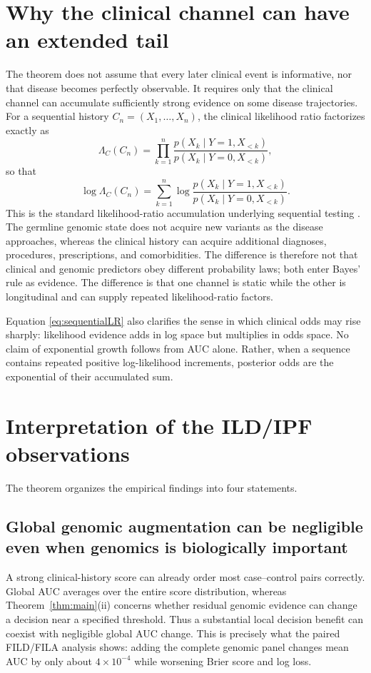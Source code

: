 \documentclass[journal]{IEEEtran}
\newcommand{\LR}{\Lambda}
\begin{document}
\section{Why the clinical channel can have an extended tail}

The theorem does not assume that every later clinical event is informative, nor that disease becomes perfectly observable. It requires only that the clinical channel can accumulate sufficiently strong evidence on some disease trajectories. For a sequential history $C_n=(X_1,\ldots,X_n)$, the clinical likelihood ratio factorizes exactly as
\begin{equation}
\LR_C(C_n)
=\prod_{k=1}^{n}
\frac{p(X_k\mid Y=1,X_{<k})}
     {p(X_k\mid Y=0,X_{<k})},
\label{eq:sequentialLR}
\end{equation}
so that
\begin{equation}
\log\LR_C(C_n)
=\sum_{k=1}^{n}
\log
\frac{p(X_k\mid Y=1,X_{<k})}
     {p(X_k\mid Y=0,X_{<k})}.
\label{eq:sequentiallogLR}
\end{equation}
This is the standard likelihood-ratio accumulation underlying sequential testing \cite{Wald1945}. The germline genomic state does not acquire new variants as the disease approaches, whereas the clinical history can acquire additional diagnoses, procedures, prescriptions, and comorbidities. The difference is therefore not that clinical and genomic predictors obey different probability laws; both enter Bayes' rule as evidence. The difference is that one channel is static while the other is longitudinal and can supply repeated likelihood-ratio factors.

Equation \eqref{eq:sequentialLR} also clarifies the sense in which clinical odds may rise sharply: likelihood evidence adds in log space but multiplies in odds space. No claim of exponential growth follows from AUC alone. Rather, when a sequence contains repeated positive log-likelihood increments, posterior odds are the exponential of their accumulated sum.

\section{Interpretation of the ILD/IPF observations}

The theorem organizes the empirical findings into four statements.

\subsection{Global genomic augmentation can be negligible even when genomics is biologically important}
A strong clinical-history score can already order most case--control pairs correctly. Global AUC averages over the entire score distribution, whereas Theorem~\ref{thm:main}(ii) concerns whether residual genomic evidence can change a decision near a specified threshold. Thus a substantial local decision benefit can coexist with negligible global AUC change. This is precisely what the paired FILD/FILA analysis shows: adding the complete genomic panel changes mean AUC by only about $4\times10^{-4}$ while worsening Brier score and log loss.
\end{document}

